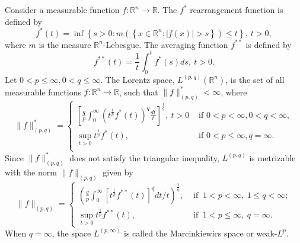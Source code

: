 \documentclass[12pt]{amsart}
\begin{document}
Consider a measurable function $f:\mathbb{R}^n\rightarrow \mathbb{R}$.  The $f^{*}$ rearrangement function is defined by
\begin{equation*}\label{rearrang}
	f^{*}(t)=\inf \left\{s>0: m\left(\left\{x \in \mathbb{R}^{n}:|f(x)|>s\right\}\right) \leq t\right\}, \ t>0,
\end{equation*}
where $m$ is the measure $\mathbb{R}^n$-Lebesgue. The averaging function $f^{**}$ is defined by
\begin{equation*}
	f^{* *}(t)=\frac{1}{t} \int_{0}^{t} f^{*}(s) d s, \  t>0.
\end{equation*}
Let $0<p \leqslant \infty, 0<q \leqslant \infty$. The Lorentz space, $L^{(p, q)} (\mathbb{R}^n)$, is the set of all measurable functions $f: \mathbb{R}^{n} \longrightarrow \mathbb{ R}$, such that $\|f\|_{(p, q)}^{*}<\infty$, where
\begin{equation}
	\|f\|^{*}_{(p, q)}=\left\{\begin{array}{ll}
		{\left[\frac{q}{p}\int_{0}^{\infty}\left(t^{\frac{1}{p}} f^{*}(t)\right)^{q} \frac{d t}{t}\right]^{\frac{1}{q}}, \ t>0} & \text { if } 0<p<\infty, 0<q<\infty, \\
		\sup _{t>0} t^{\frac{1}{p}} f^{*}(t), & \text { if } 0<p \leqslant \infty, q=\infty.\\
		
	\end{array}\right.
\end{equation}
Since $\|f\|^{*}_{(p, q)}$ does not satisfy the triangular inequality, $L^{(p,q)}$ is metrizable with the norm $\|f\| _{(p, q)}$ given by
\begin{equation}\label{norma}
	\|f\|_{(p, q)}=\left\{
	\begin{array}{ll}
		\left(\frac{q}{p} \int_{0}^{\infty}\left[t^{\frac{1}{p}} f^{* *}(t)\right]^{q} d t / t \right)^{\frac{1}{q}}, & \text { if } \  1<p<\infty, \ 1 \leq q<\infty; \\
		
		\sup _{t>0} t^{\frac{1}{p}} f^{* *}(t), & \text { if } \  1<p \leq \infty, \ q=\infty.
	\end{array}
	\right.
\end{equation}
When $q=\infty$, the space $L^{(p,\infty)}$ is called the Marcinkiewics space or weak-$L^p$.
\end{document}

